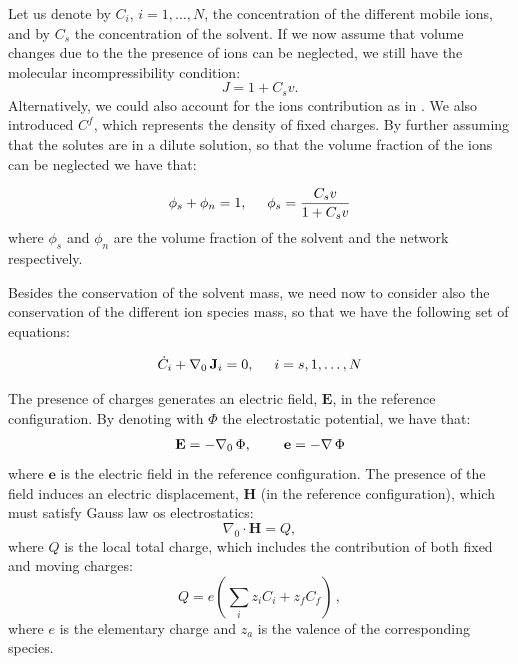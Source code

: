 \documentclass[12pt]{extarticle}
\begin{document}
Let us denote by $C_i$, $i=1,\ldots,N$, the concentration of the different mobile ions, and by $C_s$ the concentration of the solvent. If we now assume that volume changes due to the the presence of ions can be neglected, we still have the molecular incompressibility condition:
\begin{equation}
J=1+C_sv.
\end{equation}
Alternatively, we could also account for the ions contribution as in \cite{reviewpolyel}.
We also introduced $C^f$, which represents the density of fixed charges.
By further assuming that the solutes are in a dilute solution, so that the volume fraction of the ions can be neglected we have that: 

\begin{equation}
\phi_s + \phi_n = 1, \hspace{5mm} \phi_s = \frac{C_sv}{1+C_sv}
\end{equation} 
where $\phi_s$ and $\phi_n$ are the volume fraction of the solvent and the network respectively. 

Besides the conservation of the solvent mass, we need now to consider also the conservation of the different ion species mass, so that we have the following set of equations:

\begin{equation}
 \dot{C}_i + \nabla_0 \, \mathbf{J}_i = 0, \hspace{5mm} i=s,1,\ldots,N
\end{equation}

The presence of charges generates an electric field, $\mathbf{E}$, in the reference configuration. By denoting with $\Phi$ the electrostatic potential, we have that:
\begin{equation}
\mathbf{E}= -\nabla_0 \, \Phi, \hspace{8mm} \mathbf{e}= - \nabla \, \Phi
\end{equation}
where $\mathbf{e}$ is the electric field in the reference configuration. The presence of the field induces an electric displacement, $\mathbf{H}$ (in the reference configuration), which must satisfy Gauss law os electrostatics:
\begin{equation}
\nabla_0 \cdot \mathbf{H}= Q,
\label{gauss}
\end{equation}
where $Q$ is the local total charge, which includes the contribution of both fixed and moving charges:
\begin{equation}
Q = e\left(\sum\limits_{i} z_i C_i+z_f C_{f}\right)\, , 
\end{equation}
where $e$ is the elementary charge and $z_a$ is the valence of the corresponding species.
\end{document}
